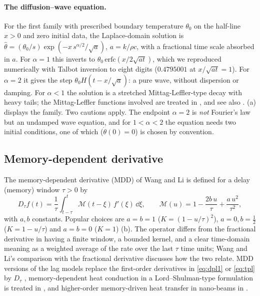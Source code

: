 \paragraph{The diffusion--wave equation.} For the first family with prescribed boundary temperature $\theta_0$ on the half-line $x>0$ and zero initial data, the Laplace-domain solution is $\hat\theta=(\theta_0/s)\exp(-x\,s^{\alpha/2}/\sqrt{a})$, $a=k/\rho c$, with a fractional time scale absorbed in $a$. For $\alpha=1$ this inverts to $\theta_0\,\mathrm{erfc}(x/2\sqrt{at})$, which we reproduced numerically with Talbot inversion to eight digits ($0.4795001$ at $x/\sqrt{at}=1$). For $\alpha=2$ it gives the step $\theta_0H(t-x/\sqrt a)$: a pure wave, without dispersion or damping. For $\alpha<1$ the solution is a stretched Mittag-Leffler-type decay with heavy tails; the Mittag-Leffler functions involved are treated in \citealp{GorenfloKilbasMainardiRogosin2014}, and see also \citealp{Luchko2010}. (a) displays the family. Two cautions apply. The endpoint $\alpha=2$ is \emph{not} Fourier's law but an undamped wave equation, and for $1<\alpha<2$ the equation needs two initial conditions, one of which ($\dot\theta(0)=0$) is chosen by convention.

\subsection{Memory-dependent derivative}
The memory-dependent derivative (MDD) of Wang and Li \citep{Wang2011} is defined for a delay (memory) window $\tau>0$ by
\begin{equation}
D_\tau f(t)=\frac1\tau\int_{t-\tau}^{t}\mathcal M(t-\xi)\,f'(\xi)\,\dd\xi,\qquad \mathcal M(u)=1-\frac{2b\,u}{\tau}+\frac{a\,u^2}{\tau^2},\label{eq:mdd}
\end{equation}
with $a,b$ constants. Popular choices are $a=b=1$ ($K=(1-u/\tau)^2$), $a=0,b=\tfrac12$ ($K=1-u/\tau$) and $a=b=0$ ($K=1$) (b). The operator differs from the fractional derivative in having a finite window, a bounded kernel, and a clear time-domain meaning as a weighted average of the rate over the last $\tau$ time units; Wang and Li's comparison with the fractional derivative \citep{Wang2021,WangLi2025IV} discusses how the two relate. MDD versions of the lag models replace the first-order derivatives in \eqref{eq:dpl1} or \eqref{eq:tpl} by $D_\tau$ \citep{Singh2019,Singh2020a,Biswas2019,Abouelregal2023,Sur2019,Hamza2014,Sur2012,Yu2014,Sherief2018}, memory-dependent heat conduction in a Lord--Shulman-type formulation is treated in \citep{Ezzat2015}, and higher-order memory-driven heat transfer in nano-beams in \citep{Sur2025}.

